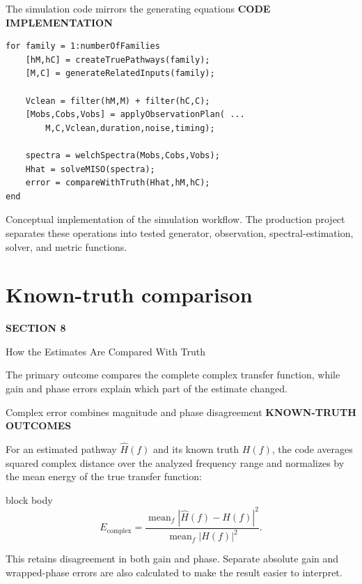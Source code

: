 \documentclass[aspectratio=169,11pt]{beamer}
\newcommand{\sectionlabel}[1]{%
  {\color{Accent}\fontsize{8}{9.5}\selectfont\bfseries\MakeUppercase{#1}}\par\vspace{0.12cm}}
\newcommand{\sourcefooter}[1]{%
  \par\vfill{\color{Muted}\fontsize{6.8}{8}\selectfont #1}}
\newenvironment{equationcallout}
  {\begin{beamercolorbox}[rounded=true,sep=0.28cm,center,wd=0.94\textwidth]{block body}%
   \setbeamercolor{block body}{bg=AccentLight,fg=Ink}\large}
  {\end{beamercolorbox}}
\newcommand{\sectionframe}[3]{%
  \begin{frame}[plain]
    \vspace{0.7cm}
    {\color{Accent}\fontsize{10}{12}\selectfont\bfseries SECTION #1}\par\vspace{0.45cm}
    {\color{Ink}\fontsize{24.5}{28}\selectfont #2}\par\vspace{0.55cm}
    {\color{Body}\fontsize{14.5}{19}\selectfont #3}
  \end{frame}}
\begin{document}
\begin{frame}[fragile]{The simulation code mirrors the generating equations}
\sectionlabel{Code Implementation}
\begin{lstlisting}[style=matlabslide]
for family = 1:numberOfFamilies
    [hM,hC] = createTruePathways(family);
    [M,C] = generateRelatedInputs(family);

    Vclean = filter(hM,M) + filter(hC,C);
    [Mobs,Cobs,Vobs] = applyObservationPlan( ...
        M,C,Vclean,duration,noise,timing);

    spectra = welchSpectra(Mobs,Cobs,Vobs);
    Hhat = solveMISO(spectra);
    error = compareWithTruth(Hhat,hM,hC);
end
\end{lstlisting}
\sourcefooter{Conceptual implementation of the simulation workflow. The production project separates these operations into tested generator, observation, spectral-estimation, solver, and metric functions.}
\end{frame}


\section{Known-truth comparison}
\sectionframe{8}{How the Estimates Are Compared With Truth}{%
The primary outcome compares the complete complex transfer function, while gain
and phase errors explain which part of the estimate changed.}

\begin{frame}{Complex error combines magnitude and phase disagreement}
\sectionlabel{Known-Truth Outcomes}
For an estimated pathway $\widehat H(f)$ and its known truth $H(f)$, the code
averages squared complex distance over the analyzed frequency range and
normalizes by the mean energy of the true transfer function:

\vspace{0.12cm}
\begin{equationcallout}
\[
E_{\mathrm{complex}}
=
\frac{\operatorname{mean}_{f}\left|\widehat H(f)-H(f)\right|^2}
     {\operatorname{mean}_{f}|H(f)|^2}.
\]
\end{equationcallout}

\vspace{0.10cm}
This retains disagreement in both gain and phase. Separate absolute gain and
wrapped-phase errors are also calculated to make the result easier to interpret.
\end{frame}
\end{document}

